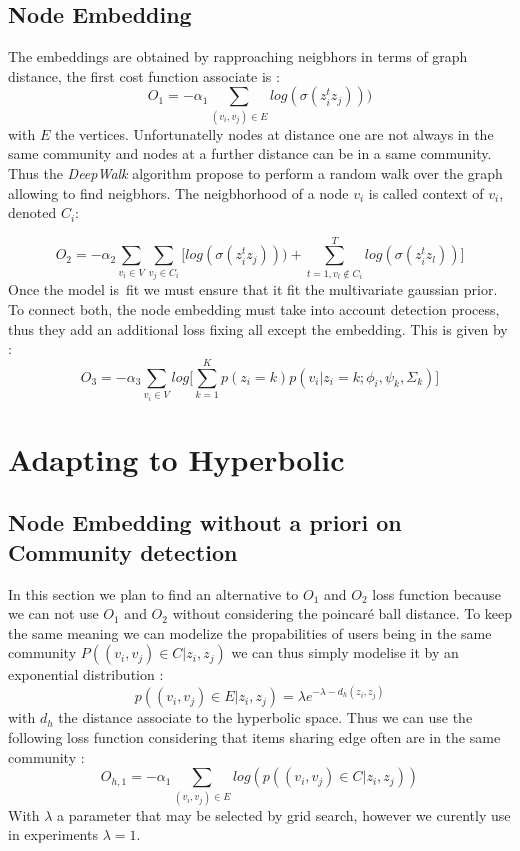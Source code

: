 \documentclass{article}
\begin{document}
    \subsection{Node Embedding}
        The embeddings are obtained by rapproaching neigbhors in terms of graph distance, the first cost function associate is : 
         $$
            O_1 = -\alpha_1 \sum \limits_{(v_i, v_j) \in E} log(\sigma(z_i^tz_j)))
         $$
         with $E$ the vertices.
         Unfortunatelly nodes at distance one are not always in the same community and nodes at a further distance can be in a same community.
         Thus the \textit{DeepWalk} algorithm propose to perform a random walk over the graph allowing to find neigbhors. 
         The neigbhorhood of a node $v_i$ is called context of $v_i$, denoted $C_i$:

        $$
            O_2 = -\alpha_2  \sum \limits_{v_i\in V} \sum \limits_{v_j \in C_i} \bigg[  log(\sigma(z_i^tz_j))) + \sum \limits_{t=1, v_l \notin C_i}^T log(\sigma(z_i^t z_l)) \bigg]
        $$
        Once the model is fit we must ensure that it fit the multivariate gaussian prior.
        To connect both, the node embedding must take into account detection process, thus they add an additional loss fixing all except the embedding.
        This is given by :
        $$
            O_3 = - \alpha_3 \sum\limits_{v_i \in V} log\bigg[\sum\limits_{k=1}^K p(z_i=k)p(v_i|z_i=k;\phi_i,\psi_k,\Sigma_k)\bigg]
        $$

    \section{Adapting to Hyperbolic}
        \subsection{Node Embedding without a priori on Community detection}
            In this section we plan to find an alternative to $O_1$ and $O_2$ loss function because we can not use $O_1$ and $O_2$ without considering the poincaré ball distance.
            To keep the same meaning we can modelize the propabilities of users being in the same community  $P((v_i,v_j)\in C | z_i, z_j)$ we can thus simply modelise it by an exponential distribution :
            $$
            p((v_i,v_j)\in E | z_i, z_j) = \lambda e^{-\lambda -d_h(z_i,z_j)}
            $$
            with $d_h$ the distance associate to the hyperbolic space.
            Thus we can use the following loss function considering that items sharing edge often are in the same community :
            $$
                O_{h,1} =  - \alpha_1 \sum_{(v_i,v_j) \in E} log(p((v_i,v_j)\in C | z_i, z_j) )
            $$
            With $\lambda$ a parameter that may be selected by grid search, however we curently use in experiments $\lambda=1$.
\end{document}
